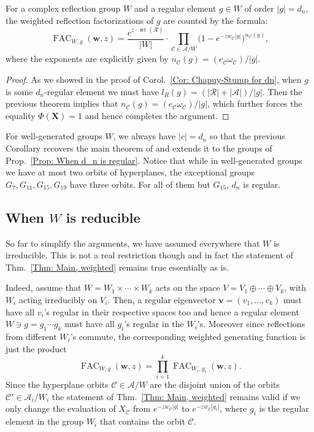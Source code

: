 \documentclass[ALCO, Unicode]{cedram}
\newcommand{\op}[1]{\operatorname{#1}}
\newcommand{\op}[1]{\operatorname{#1}}
\begin{document}
\begin{coro}
For a complex reflection group $W$ and a regular element $g\in W$ of order $|g|=d_n$, the weighted reflection factorizations of $g$ are counted by the formula:
$$\op{FAC}_{W,g}(\bm w,z)=\dfrac{e^{z\cdot\op{wt}(\mathcal{R})}}{|W|}\cdot\prod_{\mathcal{C}\in\mathcal{A}/W}\big(1-e^{-zw_{\mathcal{C}}^{\phantom{l_r}}\!|g|}\big)^{n_\mathcal{C}(g)},$$
where the exponents are explicitly given by $n_{\mathcal{C}}(g)=(e_{\mathcal{C}}\omega_{\mathcal{C}})/|g|$.
\end{coro}
\begin{proof}
As we showed in the proof of Corol.~\ref{Cor: Chapuy-Stump for dn}, when $g$ is some $d_n$-regular element we must have $l_R(g)=(|\mathcal{R}|+|\mathcal{A}|)/|g|$. Then the previous theorem implies that $n_{\mathcal{C}}(g)=(e_{\mathcal{C}}\omega_{\mathcal{C}})/|g|$, which further forces the equality $\Phi(\bm X)=1$ and hence completes the argument.
\end{proof}

\begin{rema}
For well-generated groups $W$, we always have $|c|=d_n$ so that the previous Corollary recovers the main theorem of \cite{reiner-delMas-Hameister} and extends it to the groups of Prop.~\ref{Prop: When d_n is regular}. Notice that while in well-generated groups we have at most two orbits of hyperplanes, the exceptional groups $G_{7},G_{11},G_{15},G_{19}$ have three orbits. For all of them but $G_{15}$, $d_n$ is regular.
\end{rema}

\subsection{When $W$ is reducible}
\label{Section: When W is reducible}

So far to simplify the arguments, we have assumed everywhere that $W$ is irreducible. This is not a real restriction though and in fact the statement of Thm.~\ref{Thm: Main, weighted} remains true essentially as is.

Indeed, assume that $W=W_1\times\cdots\times W_k$ acts on the space $V=V_1\oplus \cdots\oplus V_k$, with $W_i$ acting irreducibly on $V_i$. Then, a regular eigenvector $\bm v=(v_1,\ldots,v_k)$ must have all $v_i$'s regular in their respective spaces too and hence a regular element $W\ni g=g_1\cdots g_k$ must have all $g_i$'s regular in the $W_i$'s. Moreover since reflections from different $W_i$'s commute, the corresponding weighted generating function is just the product $$\op{FAC}_{W,g}(\bm w,z)=\prod_{i=1}^k\op{FAC}_{W_i,g_i}(\bm w,z).$$
Since the hyperplane orbits $\mathcal{C}\in\mathcal{A}/W$ are the disjoint union of the orbits $\mathcal{C}'\in\mathcal{A}_i/W_i$ the statement of Thm.~\ref{Thm: Main, weighted} remains valid if we only change the evaluation of $X_{\mathcal{C}}$ from $e^{-zw^{\phantom{l}}_{\mathcal{C}}|g|}$ to $e^{-zw^{\phantom{l}}_{\mathcal{C}}|g_i|}$, where $g_i$ is the regular element in the group $W_i$ that contains the orbit $\mathcal{C}$. 
 
\end{document}
